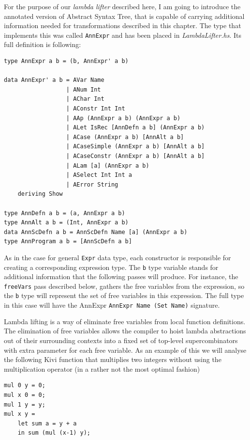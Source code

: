 \documentclass[12pt,a4paper]{report}
\begin{document}
For the purpose of our \textit{lambda lifter} described here, I am going to
introduce the annotated version of Abstract Syntax Tree, that is capable of
carrying additional information needed for transformations described in this
chapter. The type that implements this was called \texttt{AnnExpr} and has
been placed in \textit{LambdaLifter.hs}. Its full definition is following:

\vspace*{0.2in}
\begin{lstlisting}[style=haskell,label=lst:annotated_expression]
type AnnExpr a b = (b, AnnExpr' a b)

data AnnExpr' a b = AVar Name
                  | ANum Int
                  | AChar Int
                  | AConstr Int Int
                  | AAp (AnnExpr a b) (AnnExpr a b)
                  | ALet IsRec [AnnDefn a b] (AnnExpr a b)
                  | ACase (AnnExpr a b) [AnnAlt a b]
                  | ACaseSimple (AnnExpr a b) [AnnAlt a b]
                  | ACaseConstr (AnnExpr a b) [AnnAlt a b]
                  | ALam [a] (AnnExpr a b)
                  | ASelect Int Int a
                  | AError String
    deriving Show

type AnnDefn a b = (a, AnnExpr a b)
type AnnAlt a b = (Int, AnnExpr a b)
data AnnScDefn a b = AnnScDefn Name [a] (AnnExpr a b)
type AnnProgram a b = [AnnScDefn a b]
\end{lstlisting}

As in the case for general \texttt{Expr} data type, each constructor is
responsible for creating a corresponding expression type. The \texttt{b} type
variable stands for additional information that the following passes will
produce. For instance, the \texttt{freeVars} pass described below, gathers the
free variables from the expression, so the \texttt{b} type will represent the
set of free variables in this expression. The full type in this case will have
the AnnExpr \texttt{AnnExpr Name (Set Name)} signature.

Lambda lifting is a way of eliminate free variables from local function
definitions. The elimination of free variables allows the compiler to hoist
lambda abstractions out of their surrounding contexts into a fixed set of
top-level supercombinators with extra parameter for each free variable. As an
example of this we will analyse the following Kivi function that multiplies two
integers without using the multiplication operator (in a rather not the most
optimal fashion)

\vspace*{0.2in}
\begin{lstlisting}[style=haskell]
mul 0 y = 0;
mul x 0 = 0;
mul 1 y = y;
mul x y =
    let sum a = y + a
    in sum (mul (x-1) y);
\end{lstlisting}
\end{document}
